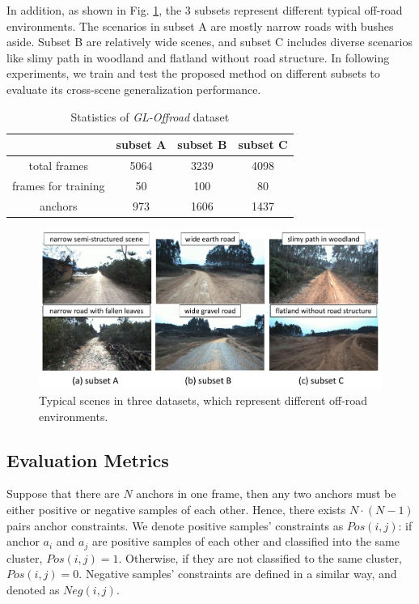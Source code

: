 \documentclass[letterpaper, 10 pt, conference]{ieeeconf}  %
\begin{document}
In addition, as shown in Fig. \ref{fig:dataset}, the 3 subsets represent different typical off-road environments. The scenarios in subset A are mostly narrow roads with bushes aside. Subset B are relatively wide scenes, and subset C includes diverse scenarios like slimy path in woodland and flatland without road structure. In following experiments, we train and test the proposed method on different subsets to evaluate its cross-scene generalization performance.

\begin{table}[h]
	\centering
	\caption{Statistics of \textit{GL-Offroad} dataset}
	\label{tab:dataset}
	\begin{tabular}{cccc} 
		\hline
		& subset A & subset B & subset C  \\ 
		\hline
		total frames        & 5064     & 3239     & 4098      \\
		frames for training & 50       & 100      & 80        \\
		anchors       & 973      & 1606     & 1437      \\
		\hline
	\end{tabular}
\end{table}

\begin{figure}[h]
	\centering
	\includegraphics[scale=0.28]{dataset.pdf}
	\caption{Typical scenes in three datasets, which represent different off-road environments.}
	\label{fig:dataset}
\end{figure}

\subsection{Evaluation Metrics}
Suppose that there are $N$ anchors in one frame, then any two anchors must be either positive or negative samples of each other. Hence, there exists $N \cdot(N-1)$ pairs anchor constraints.
We denote positive samples' constraints as $Pos(i,j)$: if anchor $a_i$ and $a_j$ are positive samples of each other and classified into the same cluster, $Pos(i,j)=1$. Otherwise, if they are not classified to the same cluster, $Pos(i,j)=0$.
Negative samples' constraints are defined in a similar way, and denoted as $Neg(i,j)$.
\end{document}
